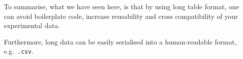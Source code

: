 To summarise, what we have seen here, is that by using long table format,
one can avoid boilerplate code, increase reusability and cross compatibility of your
experimental data.

Furthermore, long data can be easily serialised into a human-readable format, e.g.\ \texttt{.csv}.
